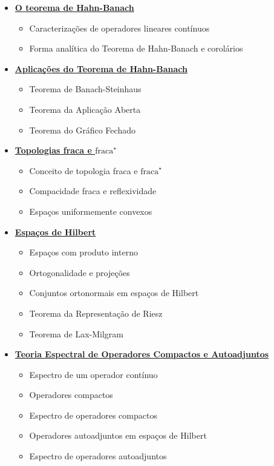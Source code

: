 \begin{itemize}
  \item \underline{\textbf{O teorema de Hahn-Banach}}
  \begin{itemize}
    \item Caracterizações de operadores lineares contínuos
    \item Forma analítica do Teorema de Hahn-Banach e corolários
  \end{itemize}
  \item \underline{\textbf{Aplicações do Teorema de Hahn-Banach}}
  \begin{itemize}
    \item Teorema de Banach-Steinhaus
    \item Teorema da Aplicação Aberta
    \item Teorema do Gráfico Fechado
  \end{itemize}
  \item \underline{\textbf{Topologias fraca e $\text{fraca}^{\star}$}}
  \begin{itemize}
    \item Conceito de topologia fraca e $\text{fraca}^{\star}$
    \item Compacidade fraca e reflexividade
    \item Espaços uniformemente convexos
  \end{itemize}
  \item \underline{\textbf{Espaços de Hilbert}}
  \begin{itemize}
    \item Espaços com produto interno
    \item Ortogonalidade e projeções
    \item Conjuntos ortonormais em espaços de Hilbert
    \item Teorema da Representação de Riesz
    \item Teorema de Lax-Milgram
  \end{itemize}
  \item \underline{\textbf{ Teoria Espectral de Operadores Compactos e Autoadjuntos}}
  \begin{itemize}
    \item Espectro de um operador contínuo
    \item Operadores compactos
    \item Espectro de operadores compactos
    \item Operadores autoadjuntos em espaços de Hilbert
    \item Espectro de operadores autoadjuntos

\end{itemize}
\end{itemize}
